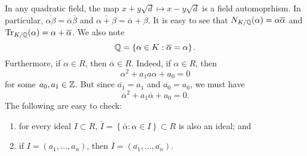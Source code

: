 In any quadratic field, the map $x + y\sqrt d \mapsto x - y\sqrt d$
is a field automoprhism.
In particular,
$\overline{\alpha\beta} = \overline\alpha \overline\beta$
and
$\overline{\alpha + \beta} = \overline\alpha + \overline\beta$.
It is easy to see that $N_{K/\mathbb{Q}}(\alpha) = \alpha \overline\alpha$
and $\operatorname{Tr}_{K/\mathbb{Q}}(\alpha) = \alpha + \overline{\alpha}$.
We also note
\[
	\mathbb{Q} = \left\{
		\alpha \in K: \overline{\alpha} = \alpha
	\right\}.
\]
Furthermore, if $\alpha \in R$, then $ \overline{\alpha} \in R$.
Indeed, if $\alpha \in R$, then
\[
	\alpha^2 + a_1 a\alpha + a_0 = 0
\]
for some $a_0,a_1 \in \mathbb{Z}$.
But since $\overline{a_1} = a_1$
and $ \overline{a_0} = a_0$, we must have
\[
	\overline{\alpha}^2 + a_1 \overline{\alpha} + a_0 = 0.
\]
The following are easy to check:
\begin{enumerate}
	\item for every ideal $I \subset R$, 
		$
			\overline I = \left\{
				\overline\alpha: \alpha \in I
			\right\} \subset R
		$ is also an ideal; and
	\item if $I = (a_1, \ldots, a_n)$, then
		$
			\overline I = (\overline{a_1}, \ldots, \overline{a_n})
		$.
\end{enumerate}
